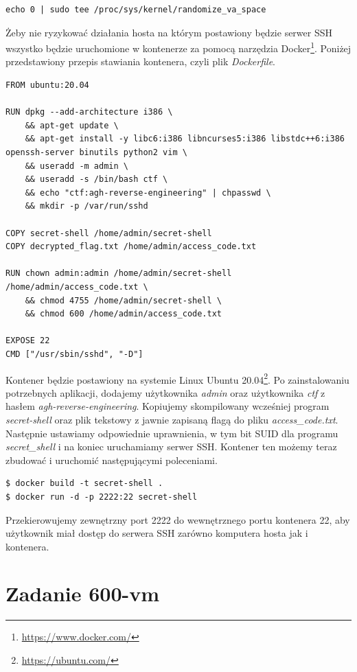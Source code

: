 \documentclass[language=polish,type=eng]{aghmodern}
\begin{document}
\begin{verbatim}
echo 0 | sudo tee /proc/sys/kernel/randomize_va_space
\end{verbatim}

Żeby nie ryzykować działania hosta na którym postawiony będzie serwer SSH wszystko
będzie uruchomione w kontenerze za pomocą narzędzia Docker\footnote{
\url{https://www.docker.com/}}. Poniżej przedstawiony przepis stawiania kontenera, czyli
plik \emph{Dockerfile}.

\begin{verbatim}
FROM ubuntu:20.04

RUN dpkg --add-architecture i386 \
    && apt-get update \
    && apt-get install -y libc6:i386 libncurses5:i386 libstdc++6:i386 openssh-server binutils python2 vim \
    && useradd -m admin \
    && useradd -s /bin/bash ctf \
    && echo "ctf:agh-reverse-engineering" | chpasswd \
    && mkdir -p /var/run/sshd

COPY secret-shell /home/admin/secret-shell
COPY decrypted_flag.txt /home/admin/access_code.txt

RUN chown admin:admin /home/admin/secret-shell /home/admin/access_code.txt \
    && chmod 4755 /home/admin/secret-shell \
    && chmod 600 /home/admin/access_code.txt

EXPOSE 22
CMD ["/usr/sbin/sshd", "-D"]
\end{verbatim}

Kontener będzie postawiony na systemie Linux Ubuntu 20.04\footnote{\url{https://ubuntu.com/}}.
Po zainstalowaniu potrzebnych aplikacji, dodajemy użytkownika \emph{admin} oraz użytkownika
\emph{ctf} z hasłem \emph{agh-reverse-engineering}. Kopiujemy skompilowany wcześniej
program \emph{secret-shell} oraz plik tekstowy z jawnie zapisaną flagą do pliku
\emph{access\_code.txt}. Następnie ustawiamy odpowiednie uprawnienia, w tym bit SUID
dla programu \emph{secret\_shell} i na koniec uruchamiamy serwer SSH.
Kontener ten możemy teraz zbudować i uruchomić następującymi poleceniami.

\begin{verbatim}
$ docker build -t secret-shell .
$ docker run -d -p 2222:22 secret-shell
\end{verbatim}

Przekierowujemy zewnętrzny port 2222 do wewnętrznego portu kontenera 22, aby użytkownik
miał dostęp do serwera SSH zarówno komputera hosta jak i kontenera.

\section{Zadanie 600-vm}
\end{document}
